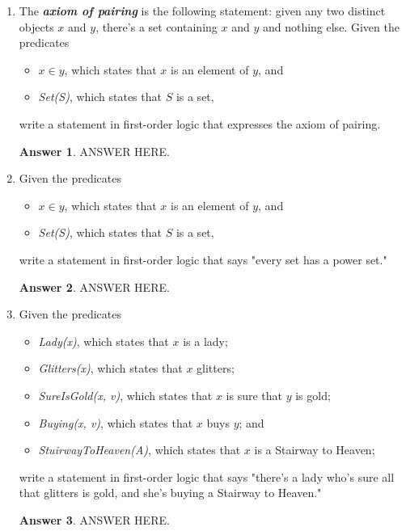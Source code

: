 \documentclass[a4paper]{article}
\renewcommand{\(}{\left(}
\renewcommand{\)}{\right)}
\theoremstyle{plain}
\theoremstyle{plain}
\theoremstyle{definition}
\newtheorem*{answer}{Answer}
\begin{document}
\begin{enumerate}[label*=\roman*.,ref=\roman*]
\item The \textbf{\textit{axiom of pairing}} is the following statement: given any two distinct objects $x$ and $y$, there's a set containing $x$ and $y$ and nothing else. Given the predicates
\begin{itemize}
  \item[] $x \in y$, which states that $x$ is an element of $y$, and
  \item[] \textit{Set(S)}, which states that $S$ is a set,
\end{itemize}
    write a statement in first-order logic that expresses the axiom of pairing.
\begin{shaded}
\begin{answer}
ANSWER HERE.
\end{answer}
\end{shaded}

\item Given the predicates
\begin{itemize}
\item[] $x \in  y$, which states that $x$ is an element of $y$, and
\item[] \textit{Set(S)}, which states that $S$ is a set,
\end{itemize}
write a statement in first-order logic that says "every set has a power set."
\begin{shaded}
\begin{answer}
ANSWER HERE.
\end{answer}
\end{shaded}

\item Given the predicates
\begin{itemize}
\item[] \textit{Lady(x)}, which states that $x$ is a lady;
\item[] \textit{Glitters(x)}, which states that $x$ glitters;
\item[] \textit{SureIsGold(x, v)}, which states that $x$ is sure that $y$ is gold;
\item[] \textit{Buying(x, v)}, which states that $x$ buys $y$; and 
\item[] \textit{StuirwayToHeaven(A)}, which states that $x$ is a Stairway to Heaven;
\end{itemize}
write a statement in first-order logic that says "there's a lady who's sure all that glitters is gold, and she's buying a Stairway to Heaven."
\begin{shaded}
\begin{answer}
ANSWER HERE.
\end{answer}
\end{shaded}

\end{enumerate}
\end{document}
